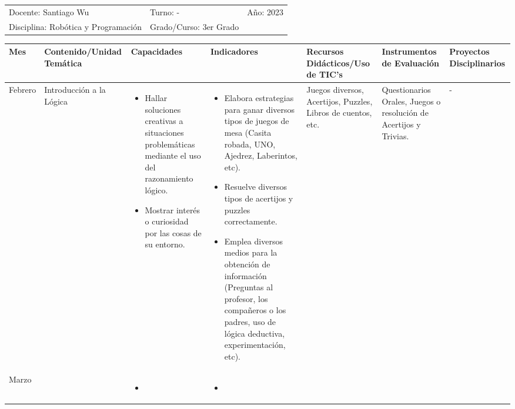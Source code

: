 \documentclass[landscape, a4paper, 10pt]{article}
\newcommand{\smallcellwidth}{0.7in}
\newcommand{\normalcellwidth}{1.2in}
\newcommand{\bigcellwidth}{2.0in}
\newcommand{\profesor}{Santiago Wu}
\newcommand{\discipline}{Robótica y Programación}
\newcommand{\currentyear}{2023}
\begin{document}
	\begin{tabularx}{\textwidth}{ >{\raggedright\arraybackslash}X >{\raggedright\arraybackslash}X >{\raggedright\arraybackslash}X }
		Docente: \profesor &
		Turno: - &
		Año: \currentyear \\
		Disciplina: \discipline &
		Grado/Curso: 3er Grado &
		 \\
	\end{tabularx}
	\centering
	\begin{longtable}{|m{\smallcellwidth}|p{\normalcellwidth}|p{\bigcellwidth}|p{\bigcellwidth}|p{\normalcellwidth}|p{\normalcellwidth}|p{\normalcellwidth}|}
		\hline
		\textbf{Mes} &
		\textbf{Contenido/Unidad Temática} &
		\textbf{Capacidades} &
		\textbf{Indicadores} &
		\textbf{Recursos Didácticos/Uso de TIC's} &
		\textbf{Instrumentos de Evaluación} &
		\textbf{Proyectos Disciplinarios} \\
		\hline
		\endhead
		Febrero &
		Introducción a la Lógica &
		\begin{itemize}
			\item Hallar soluciones creativas a situaciones problemáticas mediante el uso del razonamiento lógico.
			\item Mostrar interés o curiosidad por las cosas de su entorno.
		\end{itemize} &
		\begin{itemize}
			\item Elabora estrategias para ganar diversos tipos de juegos de mesa (Casita robada, UNO, Ajedrez, Laberintos, etc).
			\item Resuelve diversos tipos de acertijos y puzzles correctamente.
			\item Emplea diversos medios para la obtención de información (Preguntas al profesor, los compañeros o los padres, uso de lógica deductiva, experimentación, etc).
 		\end{itemize} &
		Juegos diversos, Acertijos, Puzzles, Libros de cuentos, etc. &
		Questionarios Orales, Juegos o resolución de Acertijos y Trivias. &
		 - \\
		\hline
		Marzo &
		 &
		\begin{itemize}
			\item 
		\end{itemize} &
		\begin{itemize}
			\item 
		\end{itemize} &

\end{longtable}
\end{document}
